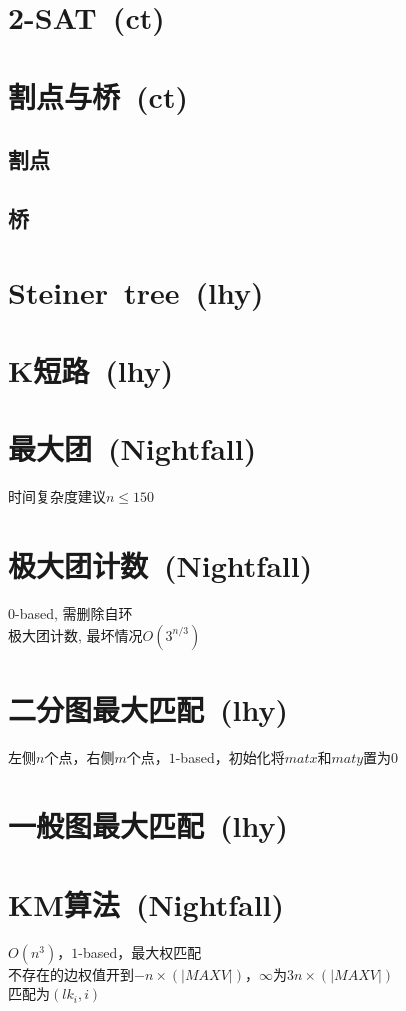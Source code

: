 \section{2-SAT\ \small(ct)}
\section{割点与桥\ \small(ct)}
	\subsection*{割点}
	\subsection*{桥}
\section{Steiner\ tree\ \small(lhy)}
\section{K短路\ \small(lhy)}
\section{最大团\ \small(Nightfall)}
	时间复杂度建议$ n \leq 150 $
\section{极大团计数\ \small(Nightfall)}
	$ 0 $-based, 需删除自环
	\\极大团计数, 最坏情况$ O(3^{n / 3}) $
\section{二分图最大匹配\ \small(lhy)}
	左侧$ n $个点，右侧$ m $个点，$ 1 $-based，初始化将$ matx $和$ maty $置为$ 0 $
\section{一般图最大匹配\ \small(lhy)}
\section{KM算法\ \small(Nightfall)}
	$ O(n^3) $，$ 1 $-based，最大权匹配
	\\不存在的边权值开到$ -n \times (\left| MAXV \right|) $，$ \infty $为$ 3 n \times (\left| MAXV \right|) $
	\\匹配为$ (lk_i, i) $
